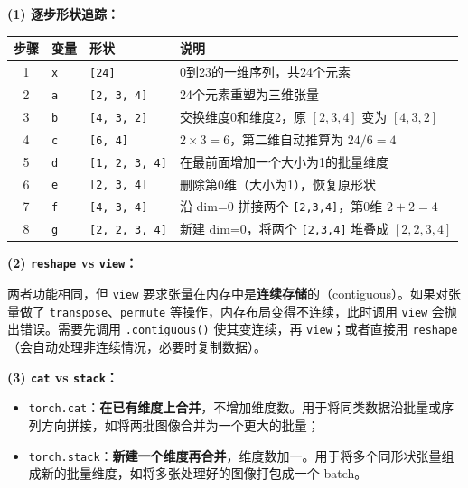 \documentclass[a4paper,11pt]{ctexart}
\begin{document}
\begin{solutionbox}[参考答案与详细解析]
    \textbf{(1) 逐步形状追踪：}

    \begin{center}
    \begin{tabular}{clll}
        \toprule
        步骤 & 变量 & 形状 & 说明 \\
        \midrule
        1 & \texttt{x} & \texttt{[24]} & 0到23的一维序列，共24个元素 \\
        2 & \texttt{a} & \texttt{[2, 3, 4]} & 24个元素重塑为三维张量 \\
        3 & \texttt{b} & \texttt{[4, 3, 2]} & 交换维度0和维度2，原 $[2,3,4]$ 变为 $[4,3,2]$ \\
        4 & \texttt{c} & \texttt{[6, 4]} & $2\times3=6$，第二维自动推算为 $24/6=4$ \\
        5 & \texttt{d} & \texttt{[1, 2, 3, 4]} & 在最前面增加一个大小为1的批量维度 \\
        6 & \texttt{e} & \texttt{[2, 3, 4]} & 删除第0维（大小为1），恢复原形状 \\
        7 & \texttt{f} & \texttt{[4, 3, 4]} & 沿 dim=0 拼接两个 \texttt{[2,3,4]}，第0维 $2+2=4$ \\
        8 & \texttt{g} & \texttt{[2, 2, 3, 4]} & 新建 dim=0，将两个 \texttt{[2,3,4]} 堆叠成 $[2,2,3,4]$ \\
        \bottomrule
    \end{tabular}
    \end{center}

    \textbf{(2) \texttt{reshape} vs \texttt{view}：}

    两者功能相同，但 \texttt{view} 要求张量在内存中是\textbf{连续存储}的（contiguous）。如果对张量做了 \texttt{transpose}、\texttt{permute} 等操作，内存布局变得不连续，此时调用 \texttt{view} 会抛出错误。需要先调用 \texttt{.contiguous()} 使其变连续，再 \texttt{view}；或者直接用 \texttt{reshape}（会自动处理非连续情况，必要时复制数据）。

    \textbf{(3) \texttt{cat} vs \texttt{stack}：}

    \begin{itemize}
        \item \texttt{torch.cat}：\textbf{在已有维度上合并}，不增加维度数。用于将同类数据沿批量或序列方向拼接，如将两批图像合并为一个更大的批量；
        \item \texttt{torch.stack}：\textbf{新建一个维度再合并}，维度数加一。用于将多个同形状张量组成新的批量维度，如将多张处理好的图像打包成一个 batch。
    \end{itemize}


\end{solutionbox}
\end{document}
